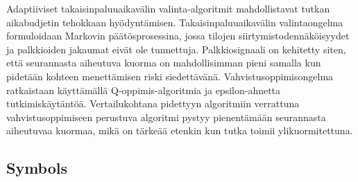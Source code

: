 \documentclass[english, 12pt, a4paper, elec, utf8, a-1b, online]{aaltothesis}
\numberwithin{equation}{section}
\begin{document}
\begin{abstractpage}[finnish]
Adaptiiviset takaisinpaluuaikavälin valinta-algoritmit mahdollistavat tutkan aikabudjetin tehokkaan hyödyntämisen. Takaisinpaluuaikavälin valintaongelma formuloidaan Markovin päätösprosessina, jossa tilojen siirtymistodennäköisyydet ja palkkioiden jakaumat eivät ole tunnettuja. Palkkiosignaali on kehitetty siten, että seurannasta aiheutuva kuorma on mahdollisimman pieni samalla kun pidetään kohteen menettämisen riski siedettävänä. Vahvistusoppimisongelma ratkaistaan käyttämällä Q-oppimis-algoritmia ja epsilon-ahnetta tutkimiskäytäntöä. Vertailukohtana pidettyyn algoritmiin verrattuna vahvistusoppimiseen perustuva algoritmi pystyy pienentämään seurannasta aiheutuvaa kuormaa, mikä on tärkeää etenkin kun tutka toimii ylikuormitettuna.
\end{abstractpage}

\newpage






\thesistableofcontents



\subsection*{Symbols}
\end{document}
